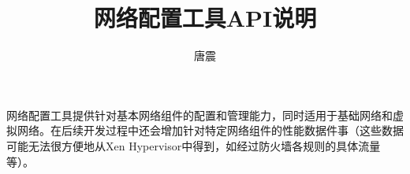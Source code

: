 \documentclass{article}
\begin{document}
\title{网络配置工具API说明}
\author{唐震}

\maketitle

网络配置工具提供针对基本网络组件的配置和管理能力，同时适用于基础网络和虚拟网络。在后续开发过程中还会增加针对特定网络组件的性能数据件事（这些数据可能无法很方便地从Xen Hypervisor中得到，如经过防火墙各规则的具体流量等）。
\end{document}

